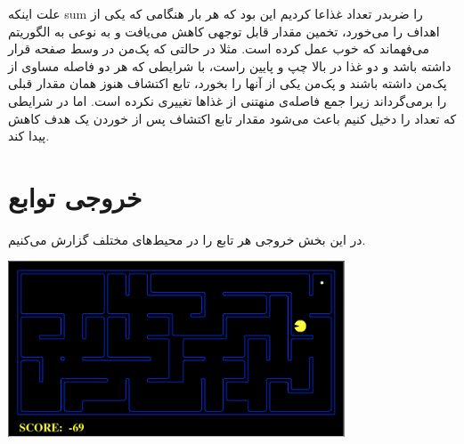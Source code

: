 \documentclass[11pt, a4paper, oneside]{book}
\begin{document}
	
	علت اینکه  sum را ضربدر تعداد غذاعا کردیم  این بود که هر بار هنگامی که یکی از اهداف را می‌خورد، تخمین مقدار قابل توجهی کاهش می‌یافت و به نوعی به الگوریتم می‌فهماند که خوب عمل کرده است. مثلا در حالتی که پک‌من در وسط صفحه قرار داشته باشد و دو غذا در بالا چپ و پایین راست، با شرایطی که هر دو فاصله مساوی از پک‌من داشته باشند و پک‌من یکی از آنها را بخورد، تابع اکتشاف هنوز همان مقدار قبلی را برمی‌گرداند زیرا جمع فاصله‌ی منهتنی از غذاها تغییری نکرده است. اما در شرایطی که تعداد را دخیل کنیم باعث می‌شود  مقدار تابع اکتشاف پس از خوردن یک هدف کاهش پیدا کند.
	
	
	
	
	
	
	
	
	
\section{خروجی توابع}
در این بخش خروجی هر تابع را در محیط‌های مختلف گزارش می‌کنیم.
	\begin{center}
	\includegraphics[width=10cm]{./images/pacman.png}
\end{center}
\end{document}
